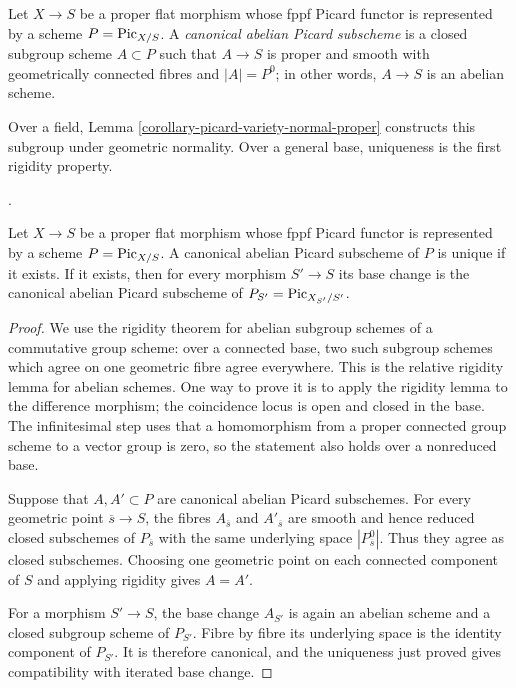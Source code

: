 \begin{definition}
\label{definition-canonical-abelian-picard-subscheme}
Let $X\to S$ be a proper flat morphism whose fppf Picard functor is
represented by a scheme $P=\mathrm{Pic}_{X/S}$. A {\it canonical abelian
Picard subscheme} is a closed subgroup scheme $A\subset P$ such that $A\to S$
is proper and smooth with geometrically connected fibres and $|A|=P^0$; in
other words, $A\to S$ is an abelian scheme.
\end{definition}

\noindent
Over a field, Lemma \ref{corollary-picard-variety-normal-proper} constructs
this subgroup under geometric normality. Over a general base, uniqueness is
the first rigidity property.

\begin{lemma}
\label{lemma-canonical-abelian-picard-unique}
\begin{reference}
\cite[Expos\'e 236, Theorem 3.3(i), pp. 237--238]{FGA}.
\end{reference}
Let $X\to S$ be a proper flat morphism whose fppf Picard functor is
represented by a scheme $P=\mathrm{Pic}_{X/S}$. A canonical abelian Picard
subscheme of $P$ is unique if it exists. If it exists, then for every morphism
$S'\to S$ its base change is the canonical abelian Picard subscheme of
$P_{S'}=\mathrm{Pic}_{X_{S'}/S'}$.
\end{lemma}

\begin{proof}
We use the rigidity theorem for abelian subgroup schemes of a commutative
group scheme: over a connected base, two such subgroup schemes which agree
on one geometric fibre agree everywhere. This is the relative rigidity lemma
for abelian schemes. One way to prove it is to apply the rigidity lemma to
the difference morphism; the coincidence locus is open and closed in the
base. The infinitesimal step uses that a homomorphism from a proper connected
group scheme to a vector group is zero, so the statement also holds over a
nonreduced base.

Suppose that $A,A'\subset P$ are canonical abelian Picard subschemes. For
every geometric point $\overline{s}\to S$, the fibres $A_{\overline{s}}$ and
$A'_{\overline{s}}$ are smooth and hence reduced closed subschemes of
$P_{\overline{s}}$ with the same underlying space $|P^0_{\overline{s}}|$.
Thus they agree as closed subschemes. Choosing one geometric point on each
connected component of $S$ and applying rigidity gives $A=A'$.

For a morphism $S'\to S$, the base change $A_{S'}$ is again an abelian scheme
and a closed subgroup scheme of $P_{S'}$. Fibre by fibre its underlying space
is the identity component of $P_{S'}$. It is therefore canonical, and the
uniqueness just proved gives compatibility with iterated base change.
\end{proof}

